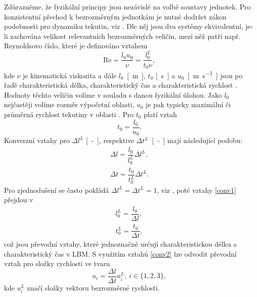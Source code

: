Zdůrazněme, že fyzikální principy jsou nezávislé na volbě soustavy jednotek. Pro konzistentní přechod k bezrozměrným jednotkám je nutné dodržet zákon podobnosti pro dynamiku tekutin, viz \cite{Landau}. Dle něj jsou dva systémy ekvivalentní, je-li zachována velikost relevantních bezrozměrných veličin, mezi něž patří např. Reynoldsovo číslo, které je definováno vztahem
\begin{equation}\label{Re}
\mathrm{Re} = \dfrac{l_{0} u_{0}}{\nu} = \dfrac{l^{2}_{0}}{t_{0} \nu},
\end{equation}
kde $ \nu $ je kinematická viskozita a dále $ l_{0} $~\si{[m]}, $ t_{0} $ \si{[s]} a $ u_{0} $~\si{[m.s^{-1}]} jsou po řadě charakteristická délka, charakteristický čas a charakteristická rychlost \cite{Landau}. Hodnoty těchto veličin volíme v souladu s danou fyzikální úlohou. Jako $ l_{0} $ nejčastěji volíme rozměr výpočetní oblasti, $ u_{0} $ je pak typicky maximální či průměrná rychlost tekutiny v oblasti \cite{Kruger}. Pro $ t_{0} $ platí vztah
\begin{equation}
t_{0} = \dfrac{l_{0}}{u_{0}}.
\end{equation}
Konverzní vztahy pro $\Delta l^{L}$ \si{[-]}, respektive $\Delta t^{L}$~\si{[-]} mají následující podobu:
\begin{subequations}\label{conv1}
	\begin{eqnarray}
	\Delta l = \dfrac{l_{0}}{{l^{L}_0}}\Delta l^{L},\\[5pt]
	\Delta t = \dfrac{t_{0}}{{t^{L}_0}}\Delta t^{L}.
	\end{eqnarray}
\end{subequations}
Pro zjednodušení se často pokládá $ \Delta l^{L} = \Delta t^{L} = 1 $, viz \cite{Kruger}, poté vztahy \eqref{conv1} přejdou v
\begin{subequations}\label{conv2}
	\begin{eqnarray}
	l^{L}_0 = \dfrac{l_{0}}{\Delta l},\\[5pt]
	t^{L}_0 = \dfrac{t_{0}}{\Delta t},
	\end{eqnarray}
\end{subequations}
což jsou převodní vztahy, které jednoznačně určují charakteristickou délku a charakteristický čas v LBM.
S využitím vztahů \eqref{conv2} lze odvodit převodní vztah pro složky rychlosti ve tvaru
\begin{equation}\label{conv_v}
u_{i} = \dfrac{\Delta l}{\Delta t} u^{L}_{i}, \ i \in \{1, 2, 3\},
\end{equation}
kde $ u^{L}_{i} $ značí složky vektoru bezrozměrné rychlosti.

